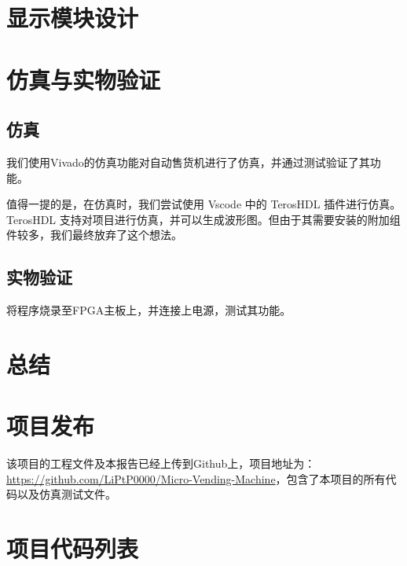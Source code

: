 \documentclass[12pt]{SEU-Circuit-Report}
\begin{document}
    \section{显示模块设计}
    
    \section{仿真与实物验证}
    \subsection{仿真}
    我们使用Vivado的仿真功能对自动售货机进行了仿真，并通过测试验证了其功能。

    值得一提的是，在仿真时，我们尝试使用 Vscode 中的 TerosHDL 插件进行仿真。TerosHDL 支持对项目进行仿真，并可以生成波形图。但由于其需要安装的附加组件较多，我们最终放弃了这个想法。
    \subsection{实物验证}
    将程序烧录至FPGA主板上，并连接上电源，测试其功能。
    \section{总结}

    \appendix
    \section{项目发布}
    该项目的工程文件及本报告已经上传到Github上，项目地址为：\url{https://github.com/LiPtP0000/Micro-Vending-Machine}，包含了本项目的所有代码以及仿真测试文件。
    \section{项目代码列表}
    
\end{document}
